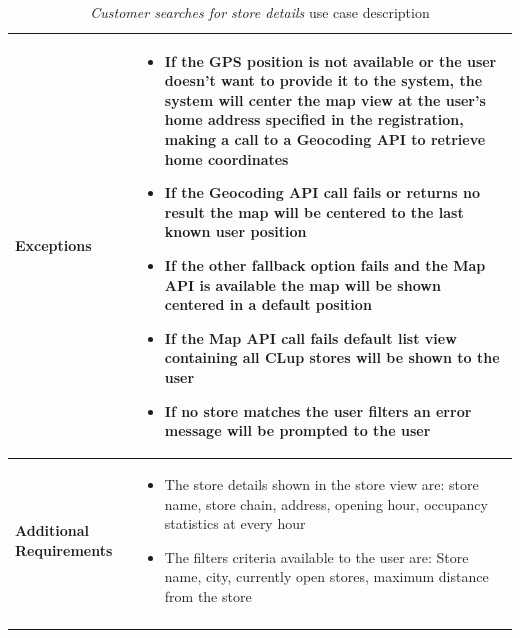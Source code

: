 \begin{longtable}{p{0.25\linewidth}p{0.75\linewidth}}
    \midrule
    \textbf{Exceptions}                       &
    \begin{itemize}
        \item If the GPS position is not available or the user doesn't want to provide it to the system, the system will center the map view at the user's home address specified in the registration, making a call to a Geocoding API to retrieve home coordinates
        \item If the Geocoding API call fails or returns no result the map will be centered to the last known user position
        \item If the other fallback option fails and the Map API is available the map will be shown centered in a default position
        \item If the Map API call fails default list view containing all CLup stores will be shown to the user
        \item If no store matches the user filters an error message will be prompted to the user
    \end{itemize}                                                                  \\
    \midrule
    \textbf{Additional \newline Requirements} &
    \begin{itemize}
        \item The store details shown in the store view are: store name, store chain, address, opening hour, occupancy statistics at every hour
        \item The filters criteria available to the user are: Store name, city, currently open stores, maximum distance from the store
    \end{itemize}                                                                  \\
    \bottomrule
    \caption{\emph{Customer searches for store details} use case description}
\end{longtable}


